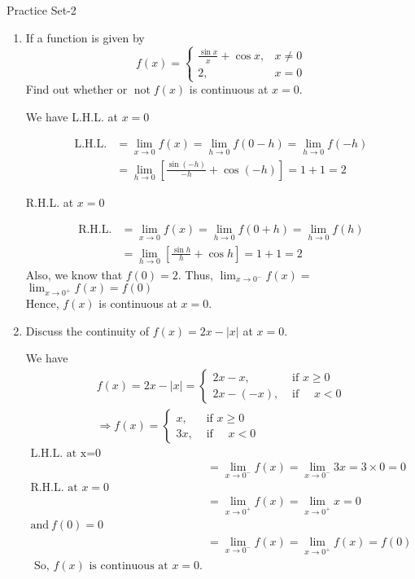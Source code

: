 \newpage\begin{abox}
	Practice Set-2
\end{abox}
\begin{enumerate}
	\item If a function is given by
	$$
	f(x)=\left\{\begin{array}{cl}
	\frac{\sin x}{x}+\cos x, & x \neq 0 \\
	2, & x=0
	\end{array}\right.
	$$
	Find out whether or $\operatorname{not} f(x)$ is continuous at $x=0$.
	\begin{answer}
		We have
		L.H.L. at $x=0$
		
		\begin{align*}
		\text{L.H.L.}&=\lim _{x \rightarrow 0} f(x)=\lim _{h \rightarrow 0} f(0-h)=\lim _{h \rightarrow 0} f(-h) \\
		&=\lim _{h \rightarrow 0}\left[\frac{\sin (-h)}{-h}+\cos (-h)\right]=1+1=2
		\end{align*}
		
		R.H.L. at $x=0$
		
		\begin{align*}
		\text{R.H.L.}&=\lim _{x \rightarrow 0} f(x)=\lim _{h \rightarrow 0} f(0+h)=\lim _{h \rightarrow 0} f(h) \\
		&=\lim _{h \rightarrow 0}\left[\frac{\sin h}{h}+\cos h\right]=1+1=2
		\end{align*}
		Also, we know that $f(0)=2 .$ Thus, $\lim _{x \rightarrow 0^{-}} f(x)=$ $\lim _{x \rightarrow 0^{+}} f(x)=f(0)$
		\\Hence, $f(x)$ is continuous at $x=0$.
		
	\end{answer}
	\item Discuss the continuity of $f(x)=2 x-|x|$ at $x=0$.
	\begin{answer}
		We have
		$$
		\begin{array}{c}
		f(x)=2 x-|x|=\left\{\begin{aligned}
		2 x-x, & \text { if } x \geq 0 \\
		2 x-(-x), & \text { if } \quad x<0
		\end{aligned}\right. \\
		\Rightarrow f(x)=\left\{\begin{aligned}
		x, & \text { if } x \geq 0 \\
		3 x, & \text { if } \quad x<0
		\end{aligned}\right.
		\end{array}
		$$
		\begin{align*}
		\text{L.H.L. at x=0}\\
		&=\lim _{x \rightarrow 0^{-}} f(x)=\lim _{x \rightarrow 0^{-}} 3 x=3 \times 0=0\\
		\text{R.H.L. at }x=0\\
		&=\lim _{x \rightarrow 0^{+}} f(x)=\lim _{x \rightarrow 0^{+}}x=0\\
		\text{and}\ f(0)=0\\
		&=\lim _{x \rightarrow 0^{-}} f(x)=\lim _{x \rightarrow 0^{+}} f(x)=f(0)\\
		\text{	So, $f(x)$ is continuous at $x=0$.}
		\end{align*}
		

\end{answer}
\end{enumerate}
